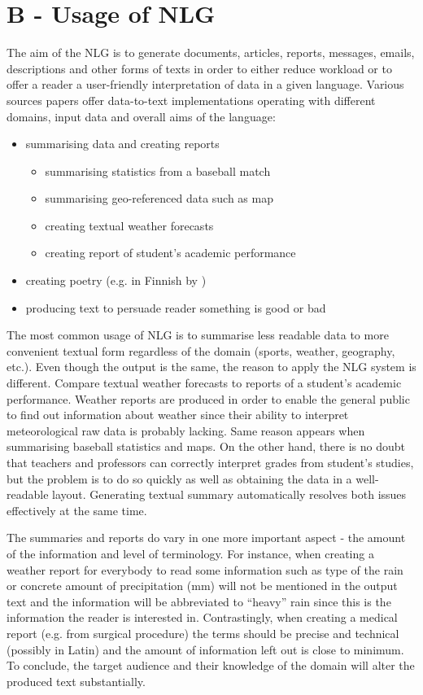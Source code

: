 \section{B - Usage of NLG}
The aim of the NLG is to generate documents, articles, reports, messages, emails, descriptions and other forms of texts in order to either reduce workload or to offer a reader a user-friendly interpretation of data in a given language. Various sources papers offer data-to-text implementations operating with different domains, input data and overall aims of the language:
\begin{itemize}
	\item summarising data and creating reports 
	\begin{itemize}
		\item summarising statistics from a baseball match \cite{puduppully2022data}
		\item summarising geo-referenced data such as map \cite{thomas2007atlas}
		\item creating textual weather forecasts \cite{sripada2014case}
		\item creating report of student's academic performance \cite{}
	\end{itemize}
	\item creating poetry (e.g. in Finnish by \cite{hamalainen2018harnessing})
	\item producing text to persuade reader something is good or bad \cite{carenini2006generating}
\end{itemize}

The most common usage of NLG is to summarise less readable data to more convenient textual form regardless of the domain (sports, weather, geography, etc.). Even though the output is the same, the reason to apply the NLG system is different. Compare textual weather forecasts to reports of a student's academic performance. Weather reports are produced in order to enable the general public to find out information about weather since their ability to interpret meteorological raw data is probably lacking. Same reason appears when summarising baseball statistics and maps. On the other hand, there is no doubt that teachers and professors can correctly interpret grades from student’s studies, but the problem is to do so quickly as well as obtaining the data in a well-readable layout. Generating textual summary automatically resolves both issues effectively at the same time.

The summaries and reports do vary in one more important aspect - the amount of the information and level of terminology. For instance, when creating a weather report for everybody to read some information such as type of the rain or concrete amount of  precipitation (mm) will not be mentioned in the output text and the information will be abbreviated to “heavy” rain since this is the information the reader is interested in. Contrastingly, when creating a medical report (e.g. from surgical procedure) the terms should be precise and technical (possibly in Latin) and the amount of information left out is close to minimum. To conclude, the target audience and their knowledge of the domain will alter the produced text substantially.

